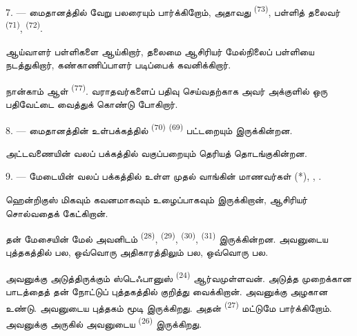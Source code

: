 7. --- மைதானத்தில் வேறு பலரையும் பார்க்கிறோம், அதாவது 
\textsuperscript{(73)}, பள்ளித் தலைவர் 
\textsuperscript{(71)},  \textsuperscript{(72)}.

ஆய்வாளர் பள்ளிகளை ஆய்கிறார், தலைமை ஆசிரியர் மேல்நிலைப் பள்ளியை நடத்துகிறார்,
கண்காணிப்பாளர் படிப்பைக் கவனிக்கிறார்.

நான்காம் ஆள்  \textsuperscript{(77)}. வராதவர்களைப் பதிவு
செய்வதற்காக அவர் அக்குளில் ஒரு பதிவேட்டை வைத்துக் கொண்டு போகிறார்.

8. --- மைதானத்தின் உள்பக்கத்தில் 
\textsuperscript{(70)}  \textsuperscript{(69)}
பட்டறையும் இருக்கின்றன.

அட்டவணையின் வலப் பக்கத்தில்  
 வகுப்பறையும் தெரியத் தொடங்குகின்றன.


\VUsaut{2.4mm}

\VUsaut{3.0mm}

9. --- மேடையின் வலப் பக்கத்தில் உள்ள முதல் வாங்கின் மாணவர்கள்
 (*), , .

ஹென்றிகுஸ் மிகவும் கவனமாகவும் உழைப்பாகவும் இருக்கிறான், ஆசிரியர் சொல்வதைக்
கேட்கிறான்.

தன் மேசையின் மேல் அவனிடம்  \textsuperscript{(28)},
 \textsuperscript{(29)},  \textsuperscript{(30)},
 \textsuperscript{(31)} இருக்கின்றன. அவனுடைய புத்தகத்தில்
 பல, ஒவ்வொரு அதிகாரத்திலும்  பல, ஒவ்வொரு
  பல.

அவனுக்கு அடுத்திருக்கும் ஸ்டெஃபானுஸ் \textsuperscript{(24)} ஆர்வமுள்ளவன். அடுத்த
முறைக்கான பாடத்தைத் தன் நோட்டுப் புத்தகத்தில் குறித்து வைக்கிறான். அவனுக்கு
அழகான  உண்டு. அவனுடைய புத்தகம் மூடி இருக்கிறது. அதன்
 \textsuperscript{(27)} மட்டுமே பார்க்கிறோம். அவனுக்கு அருகில்
அவனுடைய  \textsuperscript{(26)} இருக்கிறது.

